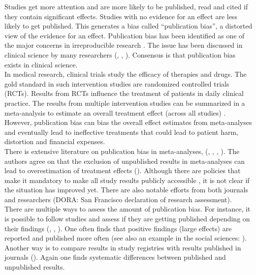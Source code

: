 \documentclass[11pt,a4paper,twoside]{book}\usepackage[]{graphicx}\usepackage[]{color}
\begin{document}
Studies get more attention and are more likely to be published, read and cited if they contain significant effects. Studies with no evidence for an effect are less likely to get published. This generates a bias called ``publication bias'', a distorted view of the evidence for an effect. Publication bias has been identified as one of the major concerns in irreproducible research \citep{Bishop.2019}. The issue has been discussed in clinical science by many researchers (\citealp{pb.clinicalscience1}, \citealp{Sterne}, \citealp{Dwan2013}). Consensus is that publication bias exists in clinical science. \\
In medical research, clinical trials study the efficacy of therapies and drugs. The gold standard in such intervention studies are randomized controlled trials (RCTs). Results from RCTs influence the treatment of patients in daily clinical practice. The results from multiple intervention studies can be summarized in a meta-analysis to estimate an overall treatment effect (across all studies) \citep{Cochran}. However, publication bias can bias the overall effect estimates from meta-analyses and eventually lead to ineffective treatments that could lead to patient harm, distortion and financial expenses. \\
There is extensive literature on publication bias in meta-analyses, \eg (\citealp{pb.clinicalscience.2013}, %
\citealp{grey.literature.4}, \citealp{grey.literature.3}, \citealp{grey.literature.2}).
The authors agree on that the exclusion of unpublished results in meta-analyses can lead to overestimation of treatment effects (\eg \citealp{Egger}). Although there are policies that make it mandatory to make all study results publicly accessible \citep{fda}, it is not clear if the situation has improved yet. There are also notable efforts from both journals \citep{Abbasi.2004} and researchers (DORA: San Francisco declaration of research assessment).\\
There are multiple ways to assess the amount of publication bias. For instance, it is possible to follow studies and assess if they are getting published depending on their findings (\citealp{Dwan2013}, \citealp{publication.fate}, \citealp{Lee.2008}). One often finds that positive findings (\ie large effects) are reported and published more often (see also an example in the social sciences: \citet{social.sciences.publication.bias}). Another way is to compare results in study registries with results published in journals (\eg \citealp{pb.clinicalscience.2013}). Again one finds systematic differences between published and unpublished results. \\
\end{document}
